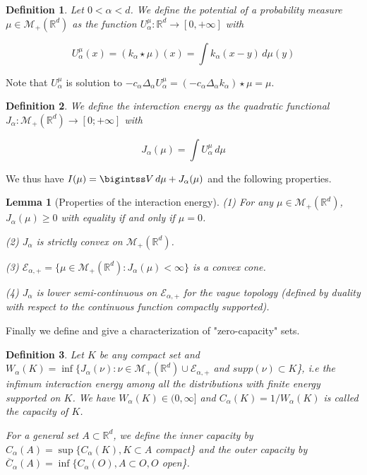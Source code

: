 \documentclass[a4paper,12pt]{report}
\newtheorem*{lem}{Lemma}
\newtheorem*{deft}{Definition}
\begin{document}
\begin{deft} 

Let $0 < \alpha < d$. We define the potential of a probability measure $\mu \in \mathcal{M}_{+}(\mathbb{R}^{d})$ as the function $U_{\alpha}^{\mu} : \mathbb{R}^{d} \longrightarrow [0, +\infty]$ with

\[U_{\alpha}^{\mu}(x) = (k_{\alpha} \star \mu)(x) = \int k_{\alpha}(x-y)\,d\mu(y)\]
\end{deft}

Note that $U_{\alpha}^{\mu}$ is solution to $-c_{\alpha} \Delta_{\alpha} U_{\alpha}^{\mu} = (-c_{\alpha} \Delta_{\alpha} k_{\alpha})\star \mu = \mu$.

\begin{deft}

We define the interaction energy as the quadratic functional $J_{\alpha} : \mathcal{M}_{+}(\mathbb{R}^{d}) \longrightarrow [0; + \infty]$ with 

\[J_{\alpha}(\mu) = \int U_{\alpha}^{\mu}\,d\mu\]
\end{deft}

We thus have $I(\mu) = \bigintss V\,d\mu + J_{\alpha}(\mu)$ and the following properties.

\begin{lem}[Properties of the interaction energy]

(1) For any $\mu \in \mathcal{M}_{+}(\mathbb{R}^{d})$, $J_{\alpha}(\mu) \geq 0$ with equality if and only if $\mu = 0$.

(2) $J_{\alpha}$ is strictly convex on $\mathcal{M}_{+}(\mathbb{R}^{d})$.

(3) $\mathcal{E}_{\alpha, +} = \{\mu \in  \mathcal{M}_{+}(\mathbb{R}^{d}) : J_{\alpha}(\mu) < \infty\}$ is a convex cone.

(4) $J_{\alpha}$ is lower semi-continuous on $\mathcal{E}_{\alpha, +}$ for the vague topology (defined by duality with respect to the continuous function compactly supported).
\end{lem}

Finally we define and give a characterization of "zero-capacity" sets.

\begin{deft}

Let $K$ be any compact set and $W_{\alpha}(K) = \inf \{J_{\alpha}(\nu) : \nu \in \mathcal{M}_{+}(\mathbb{R}^{d}) \cup \mathcal{E}_{\alpha, +}$ and $supp(\nu) \subset K$\}, i.e the infimum interaction energy among all the distributions with finite energy supported on $K$. We have $W_{\alpha}(K) \in (0, \infty]$ and $C_{\alpha}(K) = 1/W_{\alpha}(K)$ is called the capacity of $K$.
\vspace{0.5cm}

For a general set $A \subset \mathbb{R}^{d}$, we define the inner capacity by $C_{\alpha}(A)  = \sup\{C_{\alpha}(K), K \subset A$ compact\} and the outer capacity by $\overline C_{\alpha}(A) = \inf \{C_{\alpha}(O), A \subset O, O$ open\}.
\end{deft}
\end{document}
